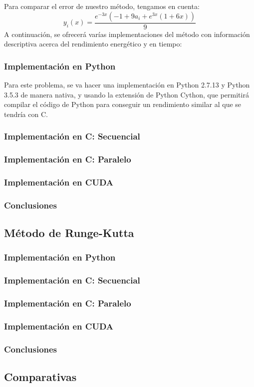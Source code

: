 Para comparar el error de nuestro método, tengamos en cuenta:
\[
	y_i(x) = \frac{e^{-3 x} (-1 + 9 a_i + e^{3 x}(1 + 6 x))}{9}
\]
A continuación, se ofrecerá varías implementaciones del método con información descriptiva acerca del rendimiento energético y en tiempo:
\subsubsection{Implementación en Python}
Para este problema, se va hacer una implementación en Python 2.7.13 y Python 3.5.3 de manera nativa, y usando la extensión de Python Cython, que permitirá compilar el código de Python para conseguir un rendimiento similar al que se tendría con C.
\subsubsection{Implementación en C: Secuencial}
\subsubsection{Implementación en C: Paralelo}
\subsubsection{Implementación en CUDA}
\subsubsection{Conclusiones}

\subsection{Método de Runge-Kutta}
\subsubsection{Implementación en Python}
\subsubsection{Implementación en C: Secuencial}
\subsubsection{Implementación en C: Paralelo}
\subsubsection{Implementación en CUDA}
\subsubsection{Conclusiones}

\subsection{Comparativas}